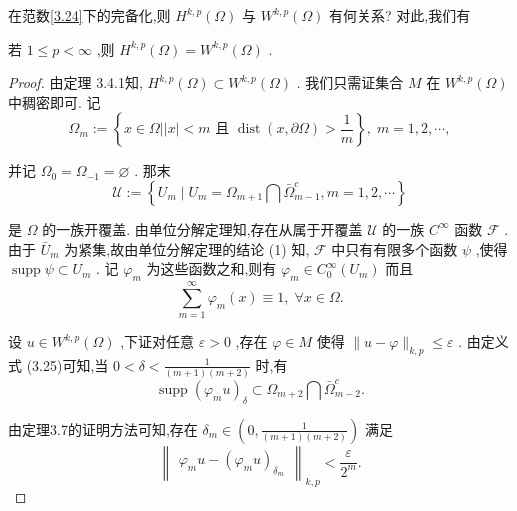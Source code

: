 \documentclass[lang=cn,newtx,10pt,scheme=chinese,thmcnt=chapter]{elegantbook}
\begin{document}
在范数\ref{3.24}下的完备化,则 \({H}^{k,p}\left( \Omega \right)\) 与 \({W}^{k,p}\left( \Omega \right)\) 有何关系? 对此,我们有
\begin{theorem}
    若 \(1 \leqslant  p < \infty\) ,则 \({H}^{k,p}\left( \Omega \right)  = {W}^{k,p}\left( \Omega \right)\) .
\end{theorem}
\begin{proof}
     由定理 3.4.1知, \({H}^{k,p}\left( \Omega \right)  \subset  {W}^{k,p}\left( \Omega \right)\) . 我们只需证集合 \(M\) 在 \({W}^{k,p}\left( \Omega \right)\) 中稠密即可. 记
\begin{equation*}
{\Omega }_{m} \mathrel{\text{ := }} \left\{  {x \in  \Omega \left| \right| x \mid   < m\text{ 且 }\operatorname{dist}\left( {x,\partial \Omega }\right)  > \frac{1}{m}}\right\}  ,\;m = 1,2,\cdots ,
\end{equation*}

并记 \({\Omega }_{0} = {\Omega }_{-1} = \varnothing\) . 那末
\begin{equation*}
\mathcal{U} \mathrel{\text{ := }} \left\{  {{U}_{m} \mid  {U}_{m} = {\Omega }_{m + 1}\bigcap {\bar{\Omega }}_{m - 1}^{c},m = 1,2,\cdots }\right\}
\end{equation*}

是 \(\Omega\) 的一族开覆盖. 由单位分解定理知,存在从属于开覆盖 \(\mathcal{U}\) 的一族 \({C}^{\infty }\) 函数 \(\mathcal{F}\) . 由于 \({\bar{U}}_{m}\) 为紧集,故由单位分解定理的结论 (1) 知, \(\mathcal{F}\) 中只有有限多个函数 \(\psi\) ,使得 \(\operatorname{supp}\psi  \subset  {U}_{m}\) . 记 \({\varphi }_{m}\) 为这些函数之和,则有 \({\varphi }_{m} \in  {C}_{0}^{\infty }\left( {U}_{m}\right)\) 而且
\begin{equation*}
\mathop{\sum }\limits_{{m = 1}}^{\infty }{\varphi }_{m}\left( x\right)  \equiv  1,\;\forall x \in  \Omega .
\end{equation*}

设 \(u \in  {W}^{k,p}\left( \Omega \right)\) ,下证对任意 \(\varepsilon  > 0\) ,存在 \(\varphi  \in  M\) 使得 \(\parallel u - \varphi {\parallel }_{k,p} \leqslant  \varepsilon\) . 由定义式 (3.25)可知,当 \(0 < \delta  < \frac{1}{\left( {m + 1}\right) \left( {m + 2}\right) }\) 时,有
\begin{equation*}
\operatorname{supp}{\left( {\varphi }_{m}u\right) }_{\delta } \subset  {\Omega }_{m + 2}\bigcap {\bar{\Omega }}_{m - 2}^{c}.
\end{equation*}

由定理3.7的证明方法可知,存在 \({\delta }_{m} \in  \left( {0,\frac{1}{\left( {m + 1}\right) \left( {m + 2}\right) }}\right)\) 满足
\begin{equation*}
{\begin{Vmatrix}{\varphi }_{m}u - {\left( {\varphi }_{m}u\right) }_{{\delta }_{m}}\end{Vmatrix}}_{k,p} < \frac{\varepsilon }{{2}^{m}}.
\end{equation*}


\end{proof}
\end{document}
